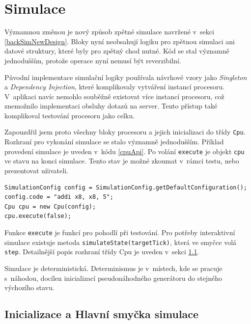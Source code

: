 \section{Simulace}
\label{implSimulace}

Významnou změnou je nový způsob zpětné simulace navržené v~sekci \ref{backSimNewDesign}.
Bloky nyní neobsahují logiku pro zpětnou simulaci ani datové struktury, které byly pro zpětný chod nutné.
Kód se stal významně jednodušším, protože operace nyní nemusí být reverzibilní.

Původní implementace simulační logiky používala návrhové vzory jako \emph{Singleton} a \emph{Dependency Injection}, které komplikovaly vytváření instancí procesoru.
V~aplikaci navíc nemohlo souběžně existovat více instancí procesoru, což znemožnilo implementaci obsluhy dotazů na server.
Tento přístup také komplikoval testování procesoru jako celku.

Zapouzdřil jsem proto všechny bloky procesoru a jejich inicializaci do třídy \texttt{Cpu}.
Rozhraní pro vykonání simulace se stalo významně jednodušším.
Příklad provedení simulace je uveden v~kódu \ref{cpuApi}.
Po volání \texttt{execute} je objekt \texttt{cpu} ve stavu na konci simulace.
Tento stav je možné zkoumat v~rámci testu, nebo prezentovat uživateli.

\begin{lstlisting}[caption={Příklad spuštění simulace s~výchozí konfigurací a vlastním kódem.},captionpos=b,label=cpuApi]
SimulationConfig config = SimulationConfig.getDefaultConfiguration();
config.code = "addi x8, x8, 5";
Cpu cpu = new Cpu(config);
cpu.execute(false);
\end{lstlisting}

Funkce \texttt{execute} je funkcí pro pohodlí při testování.
Pro potřeby interaktivní simulace existuje metoda \texttt{simulateState(targetTick)}, která ve smyčce volá \texttt{step}.
Detailnější popis rozhraní třídy Cpu je uveden v~sekci \ref{simLoop}.

Simulace je deterministická.
Determinismus je v~místech, kde se pracuje s~náhodou, docílen inicializací pseudonáhodného generátoru do stejného výchozího stavu.

\subsection{Inicializace a Hlavní smyčka simulace}
\label{simLoop}

